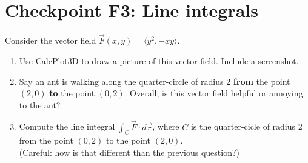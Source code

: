 


%


\allowdisplaybreaks
\section{Checkpoint F3: Line integrals}

Consider the vector field \(\vec{F}(x,y) = \langle y^2, -xy\rangle\).

\begin{enumerate}
    
    \item Use CalcPlot3D to draw a picture of this vector field. Include a screenshot.
    \item Say an ant is walking along the quarter-circle of radius 2 \textbf{from} the point $(2, 0)$ \textbf{to} the point $(0, 2)$. Overall, is this vector field helpful or annoying to the ant?
    \item Compute the line integral \(\int_C \vec{F}\cdot d\vec{r}\), where $C$ is the quarter-cicle of radius 2 from the point $(0, 2)$ to the point $(2, 0)$. \\
    (Careful: how is that different than the previous question?)
    
\end{enumerate}


	
